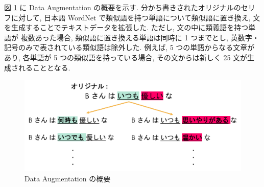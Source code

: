 図 \ref{fig:data_aug} に Data Augmentation の概要を示す.
分かち書きされたオリジナルのセリフに対して, 日本語 WordNet で類似語を持つ単語について類似語に置き換え, 文を生成することでテキストデータを拡張した. ただし, 文の中に類義語を持つ単語が
複数あった場合, 類似語に置き換える単語は同時に 1 つまでとし, 英数字・記号のみで表されている類似語は除外した. 例えば, 5 つの単語からなる文章があり,
各単語が 5 つの類似語を持っている場合, その文からは新しく 25 文が生成されることとなる.

\begin{figure}[h]
  \centering
  \includegraphics[width=0.8\hsize]{doc/figures/data_aug.png}
  \caption{Data Augmentation の概要}
  \label{fig:data_aug}
\end{figure}
